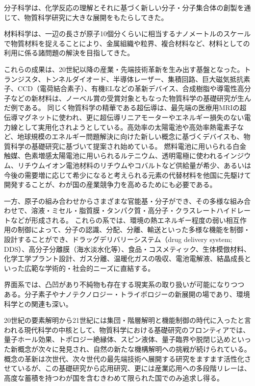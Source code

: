 分子科学は、化学反応の理解とそれに基づく新しい分子・分子集合体の創製を通じて、物質科学研究に大きな展開をもたらしてきた。

材料科学は、一辺の長さが原子10個分くらいに相当するナノメートルのスケールで物質材料を捉えることにより、金属組織や粒界、複合材料など、材料としての利用に係る諸問題の解決を目指してきた。

これらの成果は、20世紀以降の産業・先端技術革新を生み出す基盤となった。トランジスタ、トンネルダイオード、半導体レーザー、集積回路、巨大磁気抵抗素子、CCD（電荷結合素子）、有機ELなどの革新デバイス、合成樹脂や導電性高分子などの新材料は、ノーベル賞の受賞対象ともなった物質科学の基礎研究が生んだ例である。
同じく物質科学の精華である超伝導は、最先端の医療用MRIの超伝導マグネットに使われ、更に超伝導リニアモーターやエネルギー損失のない電力線として実用化されようとしている。高効率の太陽電池や高効率熱電素子など、地球規模のエネルギー問題解決に向けた新しい概念に基づくデバイスも、物質科学の基礎研究に基づいて提案され始めている。
燃料電池に用いられる白金触媒、色素増感太陽電池に用いられるルテニウム、透明電極に使われるインジウム、リチウムイオン電池材料のリチウムやコバルトなど供給量が希少、あるいは今後の需要増に応じて希少になると考えられる元素の代替材料を他国に先駆けて開発することが、わが国の産業競争力を高めるためにも必要である。

一方、原子の組み合わせからさまざまな官能基・分子ができ、その多様な組み合わせで、溶液・ミセル・脂質膜・タンパク質・高分子・クラスレートハイドレートなどが形成される。
これらの系では、環境の熱エネルギー程度の弱い相互作用の制御によって、分子の認識、分配、分離、輸送といった多様な機能を制御・設計することができ、ドラッグデリバリーシステム（drug delivery system; DDS）、高分子分離膜（海水淡水化等）、食品・コスメティック、生体模倣材料、化学工学プラント設計、ガス分離、温暖化ガスの吸収、電池電解液、結晶成長といった広範な学術的・社会的ニーズに直結する。

界面系では、凸凹があり不純物も存在する現実系の取り扱いが可能になりつつある。分子素子やナノテクノロジー・トライボロジーの新展開の場であり、環境科学との関連も深い。

20世紀の要素解明から21世紀には集団・階層解明と機能制御の時代に入ったと言われる現代科学の中核として、物質科学における基礎研究のフロンティアでは、量子ホール効果、トポロジー絶縁体、スピン液体、量子臨界や脱閉じ込めといった新概念が次々に発見され、自然の新たな機構解明への挑戦が続けられている。
概念の革新は次世代、次々世代の最先端技術へ展開する研究をますます活性化させているが、この基礎研究から応用研究、更には産業応用への多段階リレーは、高度な蓄積を持つわが国を含むきわめて限られた国でのみ追求し得る。


